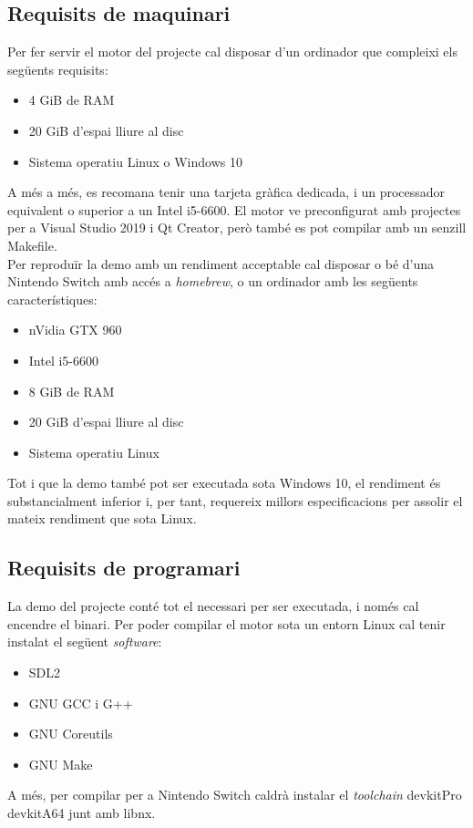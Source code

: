 \subsection{Requisits de maquinari}
Per fer servir el motor del projecte cal disposar d'un ordinador que compleixi els següents requisits:
\begin{itemize}
  \item 4 GiB de RAM
  \item 20 GiB d'espai lliure al disc
  \item Sistema operatiu Linux o Windows 10
\end{itemize}
A més a més, es recomana tenir una tarjeta gràfica dedicada, i un processador equivalent o superior a un Intel i5-6600. El motor ve preconfigurat amb projectes per a Visual Studio 2019 i Qt Creator, però també es pot compilar amb un senzill Makefile.
\\
Per reproduïr la demo amb un rendiment acceptable cal disposar o bé d'una Nintendo Switch amb accés a \textit{homebrew}, o un ordinador amb les següents característiques:
\begin{itemize}
  \item nVidia GTX 960
  \item Intel i5-6600
  \item 8 GiB de RAM
  \item 20 GiB d'espai lliure al disc
  \item Sistema operatiu Linux
\end{itemize}
Tot i que la demo també pot ser executada sota Windows 10, el rendiment és substancialment inferior i, per tant, requereix millors especificacions per assolir el mateix rendiment que sota Linux.
\subsection{Requisits de programari}
La demo del projecte conté tot el necessari per ser executada, i només cal encendre el binari.
Per poder compilar el motor sota un entorn Linux cal tenir instalat el següent \textit{software}:
\begin{itemize}
  \item SDL2
  \item GNU GCC i G++
  \item GNU Coreutils
  \item GNU Make
\end{itemize}
A més, per compilar per a Nintendo Switch caldrà instalar el \textit{toolchain} devkitPro devkitA64 junt amb libnx.

